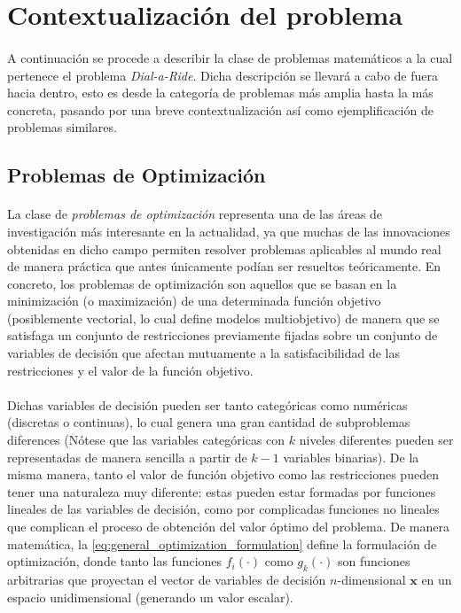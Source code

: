\documentclass{subfiles}
\begin{document}
    \section{Contextualización del problema}
    \label{sec:formulation_contextualization}

      \paragraph{}
      A continuación se procede a describir la clase de problemas matemáticos a la cual pertenece el problema \emph{Dial-a-Ride}. Dicha descripción se llevará a cabo de fuera hacia dentro, esto es desde la categoría de problemas más amplia hasta la más concreta, pasando por una breve contextualización así como ejemplificación de problemas similares.

      \subsection{Problemas de Optimización}
      \label{sec:formulation_optimization_problems}

        \paragraph{}
        La clase de \emph{problemas de optimización} representa una de las áreas de investigación más interesante en la actualidad, ya que muchas de las innovaciones obtenidas en dicho campo permiten resolver problemas aplicables al mundo real de manera práctica que antes únicamente podían ser resueltos teóricamente. En concreto, los problemas de optimización son aquellos que se basan en la minimización (o maximización) de una determinada función objetivo (posiblemente vectorial, lo cual define modelos multiobjetivo) de manera que se satisfaga un conjunto de restricciones previamente fijadas sobre un conjunto de variables de decisión que afectan mutuamente a la satisfacibilidad de las restricciones y el valor de la función objetivo.

        \paragraph{}
        Dichas variables de decisión pueden ser tanto categóricas como numéricas (discretas o continuas), lo cual genera una gran cantidad de subproblemas diferences (Nótese que las variables categóricas con $k$ niveles diferentes pueden ser representadas de manera sencilla a partir de $k-1$ variables binarias). De la misma manera, tanto el valor de función objetivo como las restricciones pueden tener una naturaleza muy diferente: estas pueden estar formadas por funciones lineales de las variables de decisión, como por complicadas funciones no lineales que complican el proceso de obtención del valor óptimo del problema. De manera matemática, la \cref{eq:general_optimization_formulation} define la formulación de optimización, donde tanto las funciones $f_i(\cdot)$ como $g_k(\cdot)$ son funciones arbitrarias que proyectan el vector de variables de decisión $n$-dimensional $\mathbf{x}$ en un espacio unidimensional (generando un valor escalar).
\end{document}
